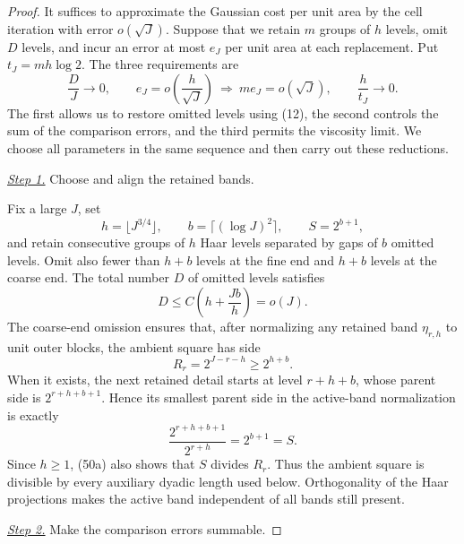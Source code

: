 \documentclass{aomart}
\theoremstyle{definition}
\newcommand{\1}{\mathbf 1}
\begin{document}
\begin{proof}
It suffices to approximate the Gaussian cost per unit area by the cell
iteration with error $o(\sqrt J)$.  Suppose that we retain $m$ groups
of $h$ levels, omit $D$ levels, and incur an error at most $e_J$ per
unit area at each replacement.  Put $t_J=mh\log2$.  The three
requirements are
\begin{equation*}
\frac{D}{J}\longrightarrow0,\qquad
e_J=o\!\left(\frac{h}{\sqrt J}\right)
\ \Longrightarrow\
m e_J=o(\sqrt J),\qquad
\frac{h}{t_J}\longrightarrow0.
\end{equation*}
The first allows us to restore omitted levels using (12), the second
controls the sum of the comparison errors, and the third permits the
viscosity limit.  We choose all parameters in the same sequence and
then carry out these reductions.

\smallskip\noindent
\underline{\textit{Step 1.}} Choose and align the retained bands.

Fix a large $J$, set
\begin{equation*}
h=\lfloor J^{3/4}\rfloor,\qquad b=\lceil(\log J)^2\rceil,\qquad
S=2^{b+1},
\end{equation*}
and retain consecutive groups of $h$ Haar levels separated by gaps of
$b$ omitted levels.  Omit also fewer than $h+b$ levels at the fine
end and $h+b$ levels at the coarse end.  The total number $D$ of
omitted levels satisfies
\begin{equation}
D\leq C\left(h+\frac{Jb}{h}\right)=o(J).
\tag{50}
\end{equation}
The coarse-end omission ensures that, after normalizing any retained
band $\eta_ {r,h}$ to unit outer blocks, the ambient square has side
\begin{equation}
R_ r=2^{J-r-h}\geq2^{h+b}.
\tag{50a}
\end{equation}
When it exists, the next retained detail starts at level $r+h+b$, whose
parent side is $2^{r+h+b+1}$.  Hence its smallest parent side in the
active-band normalization is exactly
\begin{equation*}
\frac{2^{r+h+b+1}}{2^{r+h}}=2^{b+1}=S.
\end{equation*}
Since $h\geq1$, (50a) also shows that $S$ divides $R_r$.  Thus the
ambient square is divisible by every auxiliary dyadic length used
below.  Orthogonality of the Haar projections makes the active band
independent of all bands still present.

\smallskip\noindent
\underline{\textit{Step 2.}} Make the comparison errors summable.


\end{proof}
\end{document}

